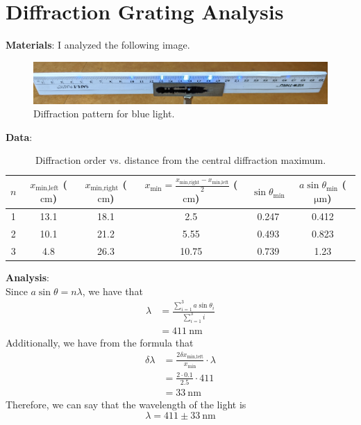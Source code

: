 \documentclass{article}
\begin{document}
\section{Diffraction Grating Analysis}
\textbf{Materials}: I analyzed the following image.
\begin{figure}[H]
    \centering
    \includegraphics[width=0.9\linewidth]{../../ExtFiles/DiffractionGratingBlue.jpeg}
    \caption{Diffraction pattern for blue light.}
    \label{fig:diffractionGratingBlue}
\end{figure}\par
\textbf{Data}:
\begin{table}[h!]
    \centering
    \renewcommand{\arraystretch}{1.4}
    \begin{tabular}{|c|c|c|c|c|c|}
        \hline
        $n$ & $x_\text{min,left}$ ($\si{\centi\meter}$) & $x_\text{min,right}$ ($\si{\centi\meter}$) & $x_\text{min}=\frac{x_\text{min,right}-x_\text{min,left}}{2}$ ($\si{\centi\meter}$) & $\sin\theta_\text{min}$ & $a\sin\theta_\text{min}$ ($\si{\micro\meter}$)\\
        \hline
        1 & 13.1 & 18.1 & 2.5   & 0.247 & 0.412\\
        \hline
        2 & 10.1 & 21.2 & 5.55  & 0.493 & 0.823\\
        \hline
        3 & 4.8  & 26.3 & 10.75 & 0.739 & 1.23\\
        \hline
    \end{tabular}
    \caption{Diffraction order vs. distance from the central diffraction maximum.}
    \label{fig:exp3data}
\end{table}\par
\textbf{Analysis}:\\
Since $a\sin\theta=n\lambda$, we have that
\begin{align*}
    \lambda &= \frac{\sum_{i=1}^3a\sin\theta_i}{\sum_{i=1}^3i}\\
    &= \SI{411}{\nano\meter}
\end{align*}
Additionally, we have from the formula that
\begin{align*}
    \delta\lambda &= \frac{2\delta x_\text{min,left}}{x_\text{min}}\cdot\lambda\\
    &= \frac{2\cdot 0.1}{2.5}\cdot 411\\
    &= \SI{33}{\nano\meter}
\end{align*}
Therefore, we can say that the wavelength of the light is
\begin{equation*}
    \lambda = 411\pm\SI{33}{\nano\meter}
\end{equation*}
\end{document}
